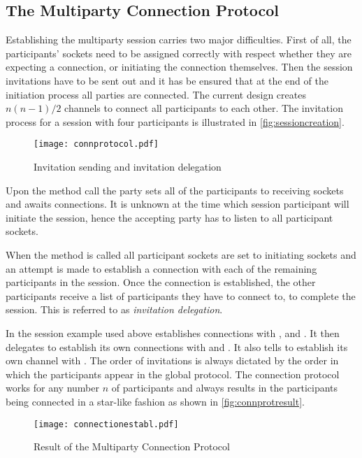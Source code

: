 \subsection{The Multiparty Connection Protocol}

Establishing the multiparty session carries two major difficulties. First of all, the participants' sockets need to be assigned correctly with respect whether they are expecting a connection, or initiating the connection themselves. Then the session invitations have to be sent out and it has be ensured that at the end of the initiation process all parties are connected. The current design creates $n (n-1) /2 $ channels to connect all participants to each other. The invitation process for a session with four participants is illustrated in \autoref{fig:sessioncreation}.  


\begin{figure}[H]
\begin{center}
\texttt{[image: connprotocol.pdf]}
\caption{Invitation sending and invitation delegation}
\label{fig:sessioncreation}
\end{center}
\end{figure}

Upon the method call  the party sets all of the participants to receiving sockets and awaits connections. It is unknown at the time which session participant will initiate the session, hence the accepting party has to listen to all participant sockets.

When the method  is called all participant sockets are set to initiating sockets and an attempt is made to establish a connection with each of the remaining participants in the session. Once the connection is established, the other participants receive a list of participants they have to connect to, to complete the session. This is referred to as \textit{invitation delegation}.

In the session example used above  establishes connections with ,  and . It then delegates  to establish its own connections with  and . It also tells  to establish its own channel with . The order of invitations is always dictated by the order in which the participants appear in the global protocol. The connection protocol works for any number $n$ of participants and always results in the participants being connected in a star-like fashion as shown in \autoref{fig:connprotresult}.

\begin{figure}[H]
\begin{center}
\texttt{[image: connectionestabl.pdf]}
\caption{Result of the Multiparty Connection Protocol}
\label{fig:connprotresult}
\end{center}
\end{figure}










